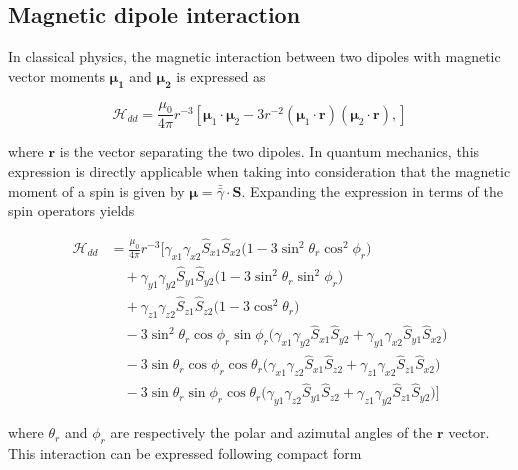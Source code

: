 \subsection{Magnetic dipole interaction}

In classical physics, the magnetic interaction between two dipoles with magnetic vector moments $\boldsymbol{\mu_1}$ and $\boldsymbol{\mu_2}$ is expressed as

\begin{equation}
    \mathcal{H}_{dd} = \frac{\mu_0}{4\pi} r^{-3} 
    \left[ \boldsymbol{\mu}_1 \cdot \boldsymbol{\mu}_2 
    - 3r^{-2} (\boldsymbol{\mu}_1 \cdot \mathbf{r})(\boldsymbol{\mu}_2 \cdot \mathbf{r}), \right]
\end{equation}

\noindent where $\mathbf{r}$ is the vector separating the two dipoles. In quantum mechanics, this expression is directly applicable when taking into consideration that the magnetic moment of a spin is given by $\boldsymbol{\mu} = \bar{\bar{\gamma}} \cdot \mathbf{S}$. Expanding the expression in terms of the spin operators yields

\begin{equation}
\begin{aligned}
\mathcal{H}_{dd} &= 
\frac{\mu_0}{4\pi} r^{-3} \Big[ 
\gamma_{x1}\gamma_{x2} \hat{S}_{x1} \hat{S}_{x2} \big( 1 - 3 \sin^2 \theta_r \cos^2 \phi_r \big) \\
&\quad + \gamma_{y1}\gamma_{y2} \hat{S}_{y1} \hat{S}_{y2} \big( 1 - 3 \sin^2 \theta_r \sin^2 \phi_r \big) \\
&\quad + \gamma_{z1}\gamma_{z2} \hat{S}_{z1} \hat{S}_{z2} \big( 1 - 3 \cos^2 \theta_r \big) \\
&\quad - 3 \sin^2 \theta_r \cos \phi_r \sin \phi_r 
\big( \gamma_{x1}\gamma_{y2} \hat{S}_{x1} \hat{S}_{y2} + \gamma_{y1}\gamma_{x2} \hat{S}_{y1} \hat{S}_{x2} \big) \\
&\quad - 3 \sin \theta_r \cos \phi_r \cos \theta_r 
\big( \gamma_{x1}\gamma_{z2} \hat{S}_{x1} \hat{S}_{z2} + \gamma_{z1}\gamma_{x2} \hat{S}_{z1} \hat{S}_{x2} \big) \\
&\quad - 3 \sin \theta_r \sin \phi_r \cos \theta_r 
\big( \gamma_{y1}\gamma_{z2} \hat{S}_{y1} \hat{S}_{z2} + \gamma_{z1}\gamma_{y2} \hat{S}_{z1} \hat{S}_{y2} \big) 
\Big]
\end{aligned}
\end{equation}

\noindent where $\theta_r$ and $\phi_r$ are respectively the polar and azimutal angles of the $\mathbf{r}$ vector. This interaction can be expressed following compact form

